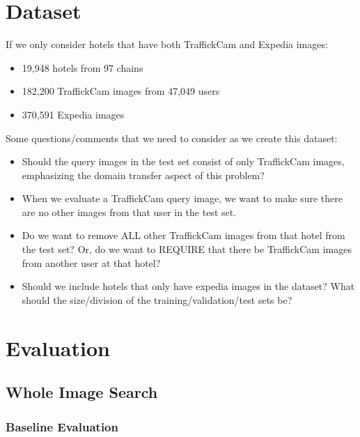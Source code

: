 \documentclass[letterpaper]{article} %
\begin{document}
\section{Dataset}

If we only consider hotels that have both TraffickCam and Expedia images:
\begin{itemize}
\item 19,948 hotels from 97 chains
\item 182,200 TraffickCam images from 47,049 users
\item 370,591 Expedia images
\end{itemize}

Some questions/comments that we need to consider as we create this dataset:
\begin{itemize}
\item Should the query images in the test set consist of only TraffickCam images, emphasizing the domain transfer aspect of this problem?
\item When we evaluate a TraffickCam query image, we want to make sure there are no other images from that user in the test set.
\item Do we want to remove ALL other TraffickCam images from that hotel from the test set? Or, do we want to REQUIRE that there be TraffickCam images from another user at that hotel?
\item Should we include hotels that only have expedia images in the dataset?
What should the size/division of the training/validation/test sets be?
\end{itemize}

\section{Evaluation}
\subsection{Whole Image Search}

\subsubsection{Baseline Evaluation}
\end{document}
